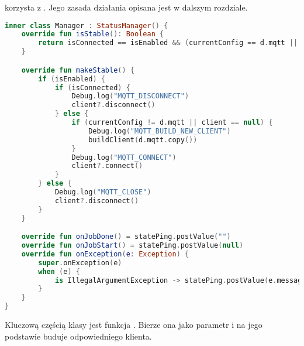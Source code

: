 \newpage

 korzysta z . Jego zasada działania opisana jest w dalszym rozdziale.

\begin{lstlisting}[language=Kotlin]
inner class Manager : StatusManager() {
    override fun isStable(): Boolean {
        return isConnected == isEnabled && (currentConfig == d.mqtt || !isEnabled)
    }

    override fun makeStable() {
        if (isEnabled) {
            if (isConnected) {
                Debug.log("MQTT_DISCONNECT")
                client?.disconnect()
            } else {
                if (currentConfig != d.mqtt || client == null) {
                    Debug.log("MQTT_BUILD_NEW_CLIENT")
                    buildClient(d.mqtt.copy())
                }
                Debug.log("MQTT_CONNECT")
                client?.connect()
            }
        } else {
            Debug.log("MQTT_CLOSE")
            client?.disconnect()
        }
    }

    override fun onJobDone() = statePing.postValue("")
    override fun onJobStart() = statePing.postValue(null)
    override fun onException(e: Exception) {
        super.onException(e)
        when (e) {
            is IllegalArgumentException -> statePing.postValue(e.message)
        }
    }
}
\end{lstlisting}

\newpage

Kluczową częścią klasy  jest funkcja . Bierze ona  jako parametr i na jego podstawie buduje odpowiedniego klienta.

